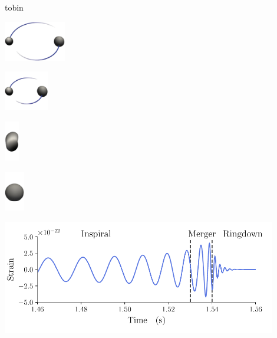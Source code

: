 

\begin{floatrow}
	
	\ffigbox[0.5cm]{}
	{{\color{white}tobin}}
	
	\ffigbox[4cm]{}
	{\includegraphics[height=1.75cm]{fig/not_mine/imr_i1.png}}
	
	\ffigbox[4cm]{}
	{\includegraphics[height=1.75cm]{fig/not_mine/imr_i2.png}}
	
	\ffigbox[2cm]{}
	{\includegraphics[height=1.75cm]{fig/not_mine/imr_m.png}}
	
	\ffigbox[2cm]{}
	{\includegraphics[height=1.75cm]{fig/not_mine/imr_r.png}}
\end{floatrow}

\begin{floatrow}
	{\includegraphics[width=0.9\textwidth]{fig/not_mine/inspiral_merger_ringdown.pdf}}
\end{floatrow}